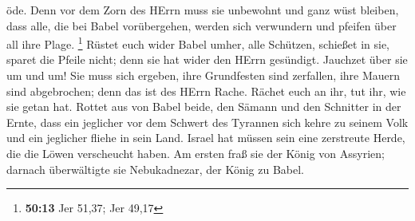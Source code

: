 öde.  Denn vor dem Zorn des HErrn muss sie unbewohnt und
ganz wüst bleiben, dass alle, die bei Babel vorübergehen, werden sich
verwundern und pfeifen über all ihre Plage. \footnote{\textbf{50:13} Jer
  51,37; Jer 49,17}  Rüstet euch wider Babel umher, alle
Schützen, schießet in sie, sparet die Pfeile nicht; denn sie hat wider
den HErrn gesündigt.  Jauchzet über sie um und um! Sie muss
sich ergeben, ihre Grundfesten sind zerfallen, ihre Mauern sind
abgebrochen; denn das ist des HErrn Rache. Rächet euch an ihr, tut ihr,
wie sie getan hat.  Rottet aus von Babel beide, den Sämann
und den Schnitter in der Ernte, dass ein jeglicher vor dem Schwert des
Tyrannen sich kehre zu seinem Volk und ein jeglicher fliehe in sein
Land.  Israel hat müssen sein eine zerstreute Herde, die
die Löwen verscheucht haben. Am ersten fraß sie der König von Assyrien;
darnach überwältigte sie Nebukadnezar, der König zu Babel.

